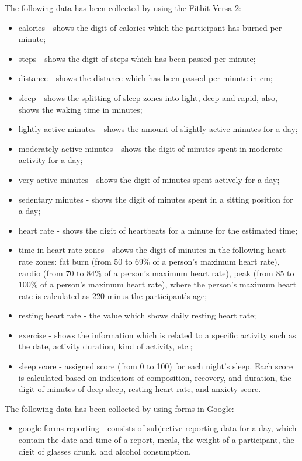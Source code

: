 \documentclass[runningheads]{llncs}
\begin{document}
The following data has been collected by using the Fitbit Versa 2:
\begin{itemize}
    \item calories - shows the digit of calories which the participant has burned per minute;
    \item steps - shows the digit of steps which has been passed per minute;
    \item distance - shows the distance which has been passed per minute in cm;
    \item sleep - shows the splitting of sleep zones into light, deep and rapid, also, shows the waking time in minutes;
    \item lightly active minutes - shows the amount of slightly active minutes for a day;
    \item moderately active minutes - shows the digit of minutes spent in moderate activity for a day;
    \item very active minutes - shows the digit of minutes spent actively for a day;
    \item sedentary minutes - shows the digit of minutes spent in a sitting position for a day;
    \item heart rate - shows the digit of heartbeats for a minute for the estimated time;
    \item time in heart rate zones - shows the digit of minutes in the following heart rate zones: fat burn (from 50 to 69\% of a person's maximum heart rate), cardio (from 70 to 84\% of a person's maximum heart rate), peak (from 85 to 100\% of a person's maximum heart rate), where the person's maximum heart rate is calculated as 220 minus the participant's age;
    \item resting heart rate - the value which shows daily resting heart rate;
    \item exercise - shows the information which is related to a specific activity such as the date, activity duration, kind of activity, etc.;
    \item sleep score - assigned score (from 0 to 100) for each night's sleep. Each score is calculated based on indicators of composition, recovery, and duration, the digit of minutes of deep sleep, resting heart rate, and anxiety score.
\end{itemize}

The following data has been collected by using forms in Google:
\begin{itemize}
    \item google forms reporting - consists of subjective reporting data for a day, which contain the date and time of a report, meals, the weight of a participant, the digit of glasses drunk, and alcohol consumption.
\end{itemize}
\end{document}
